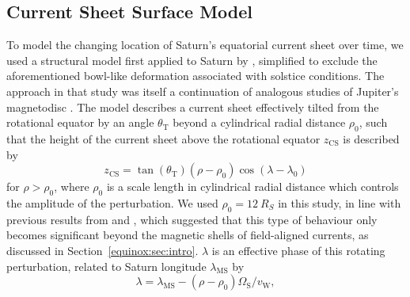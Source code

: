 \subsection{Current Sheet Surface Model}\label{equinox:sec:cssmodel}
To model the changing location of Saturn's equatorial current sheet over time, we used a structural model first applied to Saturn by \citet{arridge2011}, simplified to exclude the aforementioned bowl-like deformation associated with solstice conditions. The approach in that study was itself a continuation of analogous studies of Jupiter's magnetodisc \citep[e.g.][]{kivelson1978,khurana2005}. The model describes a current sheet effectively tilted from the rotational equator by an angle $\theta_\mathrm{T}$ beyond a cylindrical radial distance $\rho_0$, such that the height of the current sheet above the rotational equator $z_\mathrm{CS}$ is described by
\begin{equation}\label{equinox:eq:zcs}
z_\mathrm{CS} = \tan(\theta_\mathrm{T})(\rho-\rho_0)\cos(\lambda-\lambda_0)
\end{equation}
for $\rho > \rho_0$, where $\rho_0$ is a scale length in cylindrical radial distance which controls the amplitude of the perturbation. We used $\rho_0 = \SI{12}{R_S}$ in this study, in line with previous results from \citet{southwood2007} and \citet{arridge2011}, which suggested that this type of behaviour only becomes significant beyond the magnetic shells of field-aligned currents, as discussed in Section~\ref{equinox:sec:intro}. $\lambda$ is an effective phase of this rotating perturbation, related to Saturn longitude $\lambda_\mathrm{MS}$ by
\begin{equation}\label{equinox:eq:lambda}
\lambda = \lambda_\mathrm{MS} - (\rho-\rho_0)\Omega_\mathrm{S}/v_\mathrm{W},
\end{equation}
